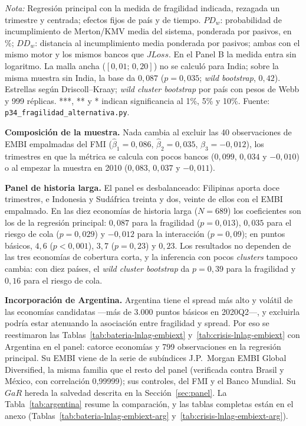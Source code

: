 \begin{table}[htbp]
\par\smallskip\parbox{0.95\linewidth}{\footnotesize \textit{Nota:} Regresión principal con la medida de fragilidad indicada, rezagada un trimestre y centrada; efectos fijos de país y de tiempo. $PD_w$: probabilidad de incumplimiento de Merton/KMV media del sistema, ponderada por pasivos, en \%; $DD_w$: distancia al incumplimiento media ponderada por pasivos; ambas con el mismo motor y los mismos bancos que $JLoss$. En el Panel B la medida entra sin logaritmo. La malla ancha ($[0{,}01;\,0{,}20]$) no se calculó para India; sobre la misma muestra sin India, la base da $0{,}087$ ($p=0{,}035$; \textit{wild bootstrap}, $0{,}42$). Estrellas según Driscoll--Kraay; \textit{wild cluster bootstrap} por país con pesos de Webb y 999 réplicas. ***, ** y * indican significancia al 1\%, 5\% y 10\%. Fuente: \texttt{p34\_fragilidad\_alternativa.py}.}
\end{table}

\textbf{Composición de la muestra.} Nada cambia al excluir las 40 observaciones de EMBI empalmadas del FMI ($\hat\beta_1=0{,}086$, $\hat\beta_2=0{,}035$, $\hat\beta_3=-0{,}012$), los trimestres en que la métrica se calcula con pocos bancos ($0{,}099$, $0{,}034$ y $-0{,}010$) o al empezar la muestra en 2010 ($0{,}083$, $0{,}037$ y $-0{,}011$).

\textbf{Panel de historia larga.} El panel es desbalanceado: Filipinas aporta doce trimestres, e Indonesia y Sudáfrica treinta y dos, veinte de ellos con el EMBI empalmado. En las diez economías de historia larga ($N=689$) los coeficientes son los de la regresión principal: $0{,}087$ para la fragilidad ($p=0{,}013$), $0{,}035$ para el riesgo de cola ($p=0{,}029$) y $-0{,}012$ para la interacción ($p=0{,}09$); en puntos básicos, $4{,}6$ ($p<0{,}001$), $3{,}7$ ($p=0{,}23$) y $0{,}23$. Los resultados no dependen de las tres economías de cobertura corta, y la inferencia con pocos \textit{clusters} tampoco cambia: con diez países, el \textit{wild cluster bootstrap} da $p=0{,}39$ para la fragilidad y $0{,}16$ para el riesgo de cola.

\textbf{Incorporación de Argentina.}\label{sec:robustez-argentina} Argentina tiene el spread más alto y volátil de las economías candidatas ---más de 3.000 puntos básicos en 2020Q2---, y excluirla podría estar atenuando la asociación entre fragilidad y spread. Por eso se reestimaron las Tablas~\ref{tab:bateria-lnlag-embiext} y~\ref{tab:crisis-lnlag-embiext} con Argentina en el panel: catorce economías y 799 observaciones en la regresión principal. Su EMBI viene de la serie de subíndices J.P.\ Morgan EMBI Global Diversified, la misma familia que el resto del panel (verificada contra Brasil y México, con correlación 0,99999); sus controles, del FMI y el Banco Mundial. Su $GaR$ hereda la salvedad descrita en la Sección~\ref{sec:panel}. La Tabla~\ref{tab:argentina} resume la comparación, y las tablas completas están en el anexo (Tablas~\ref{tab:bateria-lnlag-embiext-arg} y~\ref{tab:crisis-lnlag-embiext-arg}).

